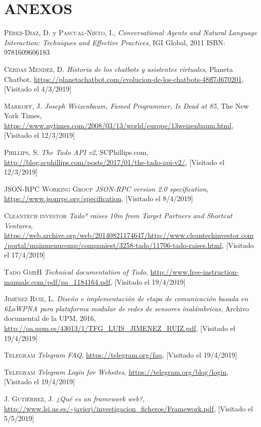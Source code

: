 \documentclass[spanish,12pt, a4paper, twoside]{paper}
\let\oldsection\section
\def\section{\cleardoublepage\oldsection}
\begin{document}
\section*{ANEXOS}


\newpage

\begin{thebibliography}{00}
 \textsc{Pérez-Diaz, D.} y \textsc{Pascual-Nieto, I.},
	\textit{Conversational Agents and Natural Language Interaction: Techniques and Effective Practices}, IGI Global, 2011 ISBN: 9781609606183
	
 \textsc{Cerdas Mendez, D.}
	\textit{Historia de los chatbots y asistentes virtuales}, Planeta Chatbot, \url{https://planetachatbot.com/evolucion-de-los-chatbots-48ff7d670201}, [Visitado el 4/3/2019]
	
 \textsc{Markoff, J.}
	\textit{Joseph Weizenbaum, Famed Programmer, Is Dead at 85}, The New York Times, \url{https://www.nytimes.com/2008/03/13/world/europe/13weizenbaum.html}, [Visitado el 12/3/2019]
	
 \textsc{Phillips, S.}
	\textit{The Tado API v2}, SCPhillips.com, \url{http://blog.scphillips.com/posts/2017/01/the-tado-api-v2/}, [Visitado el 12/3/2019]
	
 \textsc{JSON-RPC Working Group} \textit{JSON-RPC version 2.0 specification}, \url{https://www.jsonrpc.org/specification}, [Visitado el 8/4/2019]

 \textsc{Cleantech investor} \textit{Tadoº raises \texteuro10m from Target Partners and Shortcut Ventures}, \url{https://web.archive.org/web/20140821174647/http://www.cleantechinvestor.com/portal/mainmenucomp/companiest/3258-tado/11706-tado-raises.html}, [Visitado el 17/4/2019]

 \textsc{Tado GmbH} \textit{Technical documentation of Tado}, \url{http://www.free-instruction-manuals.com/pdf/pa_1184164.pdf}, [Visitado el 19/4/2019]

 \textsc{Jiménez Ruiz, L.} \textit{Diseño e implementación de etapa de comunicación basada en 6LoWPNA para plataforma modular de redes de sensores inalámbricas}, Archivo documental de la UPM, 2016, \url{http://oa.upm.es/43013/1/TFG_LUIS_JIMENEZ_RUIZ.pdf}, [Visitado el 19/4/2019]

 \textsc{Telegram} \textit{Telegram FAQ}, \url{https://telegram.org/faq}, [Visitado el 19/4/2019]

 \textsc{Telegram} \textit{Telegram Login for Websites}, \url{https://telegram.org/blog/login}, [Visitado el 19/4/2019]

 \textsc{J. Gutiérrez, J.} \textit{¿Qué es un framework web?}, \url{http://www.lsi.us.es/~javierj/investigacion_ficheros/Framework.pdf}, [Visitado el 5/5/2019]
\end{thebibliography}
\end{document}
